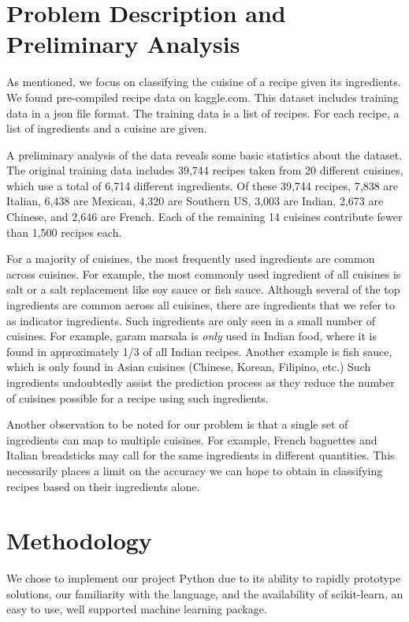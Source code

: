 \documentclass[11pt]{article}
\begin{document}
\section{Problem Description and Preliminary Analysis}
As mentioned, we focus on classifying the cuisine of a recipe given
its ingredients.  We found pre-compiled recipe data on kaggle.com.
This dataset includes training data in a json file format.  The
training data is a list of recipes.  For each recipe, a list of
ingredients and a cuisine are given.  

A preliminary analysis of the data reveals some basic statistics about
the dataset.  The original training data includes 39,744 recipes taken
from 20 different cuisines, which use a total of 6,714 different
ingredients.  Of these 39,744 recipes, 7,838 are Italian, 6,438 are
Mexican, 4,320 are Southern US, 3,003 are Indian, 2,673 are Chinese,
and 2,646 are French.  Each of the remaining 14 cuisines contribute
fewer than 1,500 recipes each.

For a majority of cuisines, the most frequently used ingredients are
common across cuisines.  For example, the most commonly used
ingredient of all cuisines is salt or a salt replacement like soy
sauce or fish sauce.  Although several of the top ingredients are
common across all cuisines, there are ingredients that we refer to as
indicator ingredients.  Such ingredients are only seen in a small
number of cuisines.  For example, garam marsala is \emph{only} used in
Indian food, where it is found in approximately 1/3 of all Indian
recipes.  Another example is fish sauce, which is only found in Asian
cuisines (Chinese, Korean, Filipino, etc.) Such ingredients
undoubtedly assist the prediction process as they reduce 
the number of cuisines possible for a recipe using such ingredients.  

Another observation to be noted for our problem is that a single set of
ingredients can map to multiple cuisines.  For example, French
baguettes and Italian breadsticks may call for the same ingredients in
different quantities.  This necessarily places a limit on the accuracy
we can hope to obtain in classifying recipes based on their
ingredients alone.


\section{Methodology}
We chose to implement our project Python due to its ability to rapidly
prototype solutions, our familiarity with the language, and the
availability of scikit-learn\cite{scikit}, an easy to use, well supported machine
learning package.  
\end{document}
